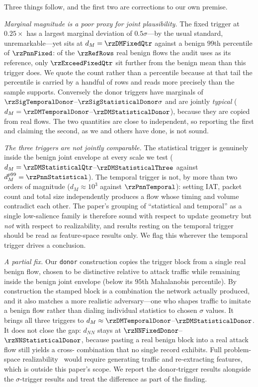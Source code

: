 Three things follow, and the first two are corrections to our own premise.

\emph{Marginal magnitude is a poor proxy for joint plausibility.} The fixed
trigger at $0.25\times$ has a largest marginal deviation of
$0.5\sigma$---by the usual standard, unremarkable---yet sits at
$d_M=\rzDMFixedQtr$ against a benign $99$th percentile of $\rzPnnFixed$: of the
$\rzRefRows$ real benign flows the audit uses as its reference, only
$\rzExceedFixedQtr$ sit further from the benign mean than this trigger does. We quote
the count rather than a percentile because at that tail the percentile is carried by a
handful of rows and reads more precisely than the sample supports. Conversely the donor triggers have marginals of
$\rzSigTemporalDonor$--$\rzSigStatisticalDonor\sigma$ and are jointly
\emph{typical} ($d_M=\rzDMTemporalDonor$--$\rzDMStatisticalDonor$), because they are copied from
real flows. The two quantities are close to independent, so reporting the first
and claiming the second, as we and others have done, is not sound.

\emph{The three triggers are not jointly comparable.} The statistical trigger is
genuinely inside the benign joint envelope at every scale we test
($d_M=\rzDMStatisticalQtr$--$\rzDMStatisticalThree$ against
$d_M^{p99}=\rzPnnStatistical$). The temporal trigger is not, by
more than two orders of magnitude ($d_M\approx10^3$ against $\rzPnnTemporal$): setting IAT,
packet count and total size independently produces a flow whose timing and volume
contradict each other. The paper's grouping of ``statistical and temporal'' as a
single low-salience family is therefore sound with respect to update geometry but
\emph{not} with respect to realizability, and results resting on the temporal
trigger should be read as feature-space results only. We flag this wherever the
temporal trigger drives a conclusion.

\emph{A partial fix.} Our \texttt{donor} construction copies the trigger block
from a single real benign flow, chosen to be distinctive relative to attack
traffic while remaining inside the benign joint envelope (below its $95$th
Mahalanobis percentile). By construction the stamped block is a combination the
network actually produced, and it also matches a more realistic adversary---one
who shapes traffic to imitate a benign flow rather than dialing individual
statistics to chosen $\sigma$ values. It brings all three triggers to
$d_M\approx\rzDMTemporalDonor$--$\rzDMStatisticalDonor$. It does not close the
gap: $d_{NN}$ stays at $\rzNNFixedDonor$--$\rzNNStatisticalDonor$, because
pasting a real benign block into a real attack flow still yields a cross-
combination that no single record exhibits. Full problem-space
realizability~\cite{pierazzi2020problem} would require generating traffic and
re-extracting features, which is outside this paper's scope. We report the
donor-trigger results alongside the $\sigma$-trigger results and treat the
difference as part of the finding.

